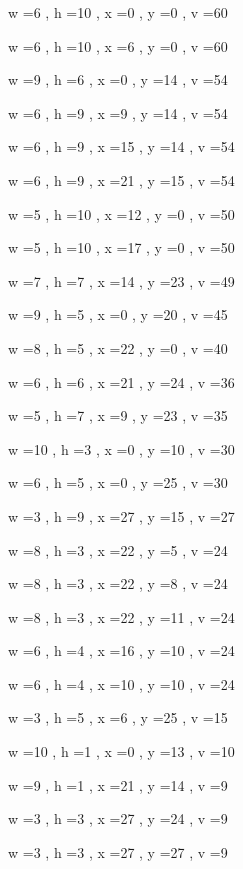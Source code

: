 \documentclass[11pt]{article}
\begin{document}
w =6 , h =10 , x =0 , y =0 , v =60
\par
w =6 , h =10 , x =6 , y =0 , v =60
\par
w =9 , h =6 , x =0 , y =14 , v =54
\par
w =6 , h =9 , x =9 , y =14 , v =54
\par
w =6 , h =9 , x =15 , y =14 , v =54
\par
w =6 , h =9 , x =21 , y =15 , v =54
\par
w =5 , h =10 , x =12 , y =0 , v =50
\par
w =5 , h =10 , x =17 , y =0 , v =50
\par
w =7 , h =7 , x =14 , y =23 , v =49
\par
w =9 , h =5 , x =0 , y =20 , v =45
\par
w =8 , h =5 , x =22 , y =0 , v =40
\par
w =6 , h =6 , x =21 , y =24 , v =36
\par
w =5 , h =7 , x =9 , y =23 , v =35
\par
w =10 , h =3 , x =0 , y =10 , v =30
\par
w =6 , h =5 , x =0 , y =25 , v =30
\par
w =3 , h =9 , x =27 , y =15 , v =27
\par
w =8 , h =3 , x =22 , y =5 , v =24
\par
w =8 , h =3 , x =22 , y =8 , v =24
\par
w =8 , h =3 , x =22 , y =11 , v =24
\par
w =6 , h =4 , x =16 , y =10 , v =24
\par
w =6 , h =4 , x =10 , y =10 , v =24
\par
w =3 , h =5 , x =6 , y =25 , v =15
\par
w =10 , h =1 , x =0 , y =13 , v =10
\par
w =9 , h =1 , x =21 , y =14 , v =9
\par
w =3 , h =3 , x =27 , y =24 , v =9
\par
w =3 , h =3 , x =27 , y =27 , v =9
\par
\newpage
\end{document}
